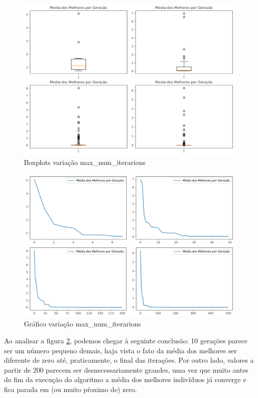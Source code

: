 \documentclass[12pt]{article}
\begin{document}
\begin{figure}[H]
	\centering
	\includegraphics[width=0.9\linewidth]{Imagens/maxnumiteration/boxplotMaxNumIt}
	\caption{Boxplots variação max\_num\_iterarions}
	\label{fig:boxplotmaxnumit}
\end{figure}
\begin{figure}[H]
	\centering
	\includegraphics[width=0.9\linewidth]{Imagens/maxnumiteration/graficoMaxNumIt}
	\caption{Gráfico variação max\_num\_iterarions}
	\label{fig:graficomaxnumit}
\end{figure}

Ao analisar a figura \ref{fig:graficomaxnumit}, podemos chegar à seguinte conclusão: 10 gerações parece ser um número pequeno demais,  haja vista o fato da média dos melhores ser diferente de zero até, praticamente, o final das iterações. Por outro lado, valores a partir de 200 parecem ser desnecessariamente grandes, uma vez que muito antes do fim da execução do algoritmo a média dos melhores indivíduos já converge e fica parada em (ou muito pŕoximo de) zero.
\end{document}

